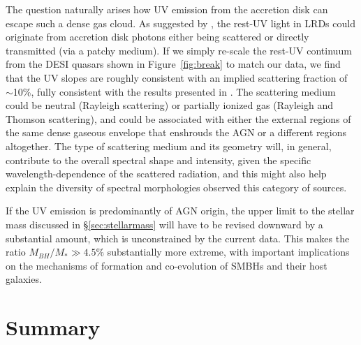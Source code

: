 \documentclass[twocolumn]{aastex7}
\begin{document}
The question naturally arises how UV emission from the accretion disk can escape such a dense gas cloud. As suggested by \citet{greene24}, the rest-UV light in LRDs could originate from accretion disk photons either being scattered or directly transmitted (via a patchy medium). If we simply re-scale the rest-UV continuum from the DESI quasars shown in Figure~\ref{fig:break} to match our data, we find that the UV slopes are roughly consistent with an implied scattering fraction of $\sim$10\%, fully consistent with the results presented in \citet{greene24}. The scattering medium could be neutral (Rayleigh scattering) or partially ionized gas (Rayleigh and Thomson scattering), and could be associated with either the external regions of the same dense gaseous envelope that enshrouds the AGN or a different regions altogether. The type of scattering medium and its geometry will, in general, contribute to the overall spectral shape and intensity, given the specific wavelength-dependence of the scattered radiation, and this might also help explain the diversity of spectral morphologies observed this category of sources. 

If the UV emission is predominantly of AGN origin, the upper limit to the stellar mass discussed in \S\ref{sec:stellarmass} will have to be revised downward by a substantial amount, which is unconstrained by the current data.  This makes the ratio $M_{BH}/M_*\gg 4.5\%$ substantially more extreme, with important implications on the mechanisms of formation and co-evolution of SMBHs and their host galaxies.

\section{Summary}\label{sec:summary}
\end{document}
